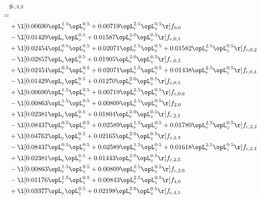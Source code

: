 \begin{alignat}{2} 
\label{eq:g_33_0} 
& g_{c,3,3} \nonumber \\ 
 = \\ 
& + \l[  0.00690 \opL_r^{1.5} \opL_z^{0.5} +  0.00719 \opL_r^{2.5} \opL_z^{0.5}  \r] f_{0,0} \nonumber \\ 
& - \l[  0.01429 \opL_r \opL_z^{0.5} +  0.01587 \opL_r^{2.0} \opL_z^{0.5}  \r] f_{c,0,1} \nonumber \\ 
& + \l[  0.02454 \opL_r^{0.5} \opL_z^{0.5} +  0.02071 \opL_r^{1.5} \opL_z^{0.5} +  0.01582 \opL_r^{2.5} \opL_z^{0.5}  \r] f_{c,0,2} \nonumber \\ 
& - \l[  0.02857 \opL_r \opL_z^{0.5} +  0.01905 \opL_r^{2.0} \opL_z^{0.5}  \r] f_{c,0,3} \nonumber \\ 
& + \l[  0.02454 \opL_r^{0.5} \opL_z^{0.5} +  0.02071 \opL_r^{1.5} \opL_z^{0.5} +  0.01438 \opL_r^{2.5} \opL_z^{0.5}  \r] f_{c,0,4} \nonumber \\ 
& - \l[  0.01429 \opL_r \opL_z^{0.5} +  0.01270 \opL_r^{2.0} \opL_z^{0.5}  \r] f_{c,0,5} \nonumber \\ 
& + \l[  0.00690 \opL_r^{1.5} \opL_z^{0.5} +  0.00719 \opL_r^{2.5} \opL_z^{0.5}  \r] f_{c,0,6} \nonumber \\ 
& - \l[  0.00863 \opL_r^{1.5} \opL_z^{0.5} +  0.00809 \opL_r^{2.5} \opL_z^{0.5}  \r] f_{2,0} \nonumber \\ 
& + \l[  0.02381 \opL_r \opL_z^{0.5} +  0.01804 \opL_r^{2.0} \opL_z^{0.5}  \r] f_{c,2,1} \nonumber \\ 
& - \l[  0.08437 \opL_r^{0.5} \opL_z^{0.5} +  0.02589 \opL_r^{1.5} \opL_z^{0.5} +  0.01780 \opL_r^{2.5} \opL_z^{0.5}  \r] f_{c,2,2} \nonumber \\ 
& + \l[  0.04762 \opL_r \opL_z^{0.5} +  0.02165 \opL_r^{2.0} \opL_z^{0.5}  \r] f_{c,2,3} \nonumber \\ 
& - \l[  0.08437 \opL_r^{0.5} \opL_z^{0.5} +  0.02589 \opL_r^{1.5} \opL_z^{0.5} +  0.01618 \opL_r^{2.5} \opL_z^{0.5}  \r] f_{c,2,4} \nonumber \\ 
& + \l[  0.02381 \opL_r \opL_z^{0.5} +  0.01443 \opL_r^{2.0} \opL_z^{0.5}  \r] f_{c,2,5} \nonumber \\ 
& - \l[  0.00863 \opL_r^{1.5} \opL_z^{0.5} +  0.00809 \opL_r^{2.5} \opL_z^{0.5}  \r] f_{c,2,6} \nonumber \\ 
& - \l[  0.01176 \opL_r^{1.5} \opL_z^{0.5} +  0.00843 \opL_r^{2.5} \opL_z^{0.5}  \r] f_{4,0} \nonumber \\ 
& + \l[  0.03377 \opL_r \opL_z^{0.5} +  0.02198 \opL_r^{2.0} \opL_z^{0.5}  \r] f_{c,4,1} \nonumber \\ 

\end{alignat}
